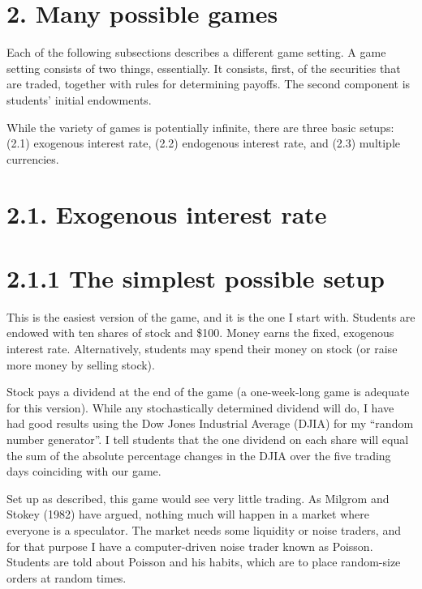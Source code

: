 \section{2. Many possible games}%
Each of the following subsections describes a different game setting. 
A game setting consists of two things, essentially.  It consists, 
first, of the securities that are traded, together with rules for 
determining payoffs.  The second component is students' initial 
endowments. 
 
While the variety of games is potentially infinite, there are three 
basic setups: (2.1) exogenous interest rate, (2.2) endogenous interest rate, 
and (2.3) multiple currencies. 
 
\section{2.1. Exogenous interest rate}%
 
\section{2.1.1 The simplest possible setup}%
This is the easiest version of the game, and it is the one I start with. 
Students are endowed with ten shares of stock and \$100.  Money earns 
the fixed, exogenous interest rate.  Alternatively, students may spend 
their money on stock (or raise more money by selling stock). 
 
Stock pays a dividend at the end of the game (a one-week-long game is 
adequate for this version).  While any stochastically determined 
dividend will do, I have had good results using the Dow Jones 
Industrial Average (DJIA) for my ``random number generator''.  I tell 
students that the one dividend on each share will equal the sum of 
the absolute percentage changes in the DJIA over the five trading 
days coinciding with our game.%
 
Set up as described, this game would see very little trading.  As 
Milgrom and Stokey (1982) have argued, nothing much will happen in a 
market where everyone is a speculator.  The market needs some liquidity 
or noise traders, and for that purpose I have a computer-driven noise 
trader known as Poisson.  Students are told about Poisson and his 
habits, which are to place random-size orders at random times.%
 
